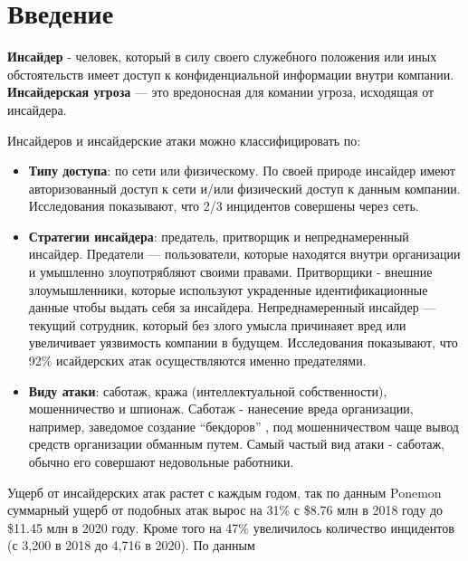 \section*{Введение}
\textbf{Инсайдер} - человек, который в силу своего служебного положения или иных обстоятельств имеет доступ к конфиденциальной информации внутри компании.
\textbf{Инсайдерская угроза} --- это вредоносная для комании угроза, исходящая от инсайдера. 

Инсайдеров и инсайдерские атаки можно классифицировать по: 
\begin{itemize}
\item \textbf{Типу доступа}: по сети или физическому. По своей природе инсайдер имеют авторизованный доступ к сети и/или физический доступ к данным компании. Исследования показывают, что 2/3 инцидентов совершены через сеть.\cite{review2020}
\item \textbf{Стратегии инсайдера}: предатель, притворщик и непреднамеренный инсайдер. Предатели --- пользователи, которые находятся внутри организации и умышленно злоупотрябляют своими правами. Притворщики - внешние злоумышленники, которые используют украденные идентификационные данные чтобы выдать себя за инсайдера. Непреднамеренный инсайдер --- текущий сотрудник, который без злого умысла причинаяет вред или увеличивает уязвимость компании в будущем. Исследования показывают, что 92\% исайдерских атак осуществляются именно предателями.\cite{review2020}
\item \textbf{Виду атаки}: саботаж, кража (интеллектуальной собственности), мошенничество и шпионаж. Саботаж - нанесение вреда организации, например, заведомое создание ``бекдоров'' , под мошенничеством чаще вывод средств организации обманным путем. Самый частый вид атаки - саботаж\cite{review2020}, обычно его совершают недовольные работники.
\end{itemize}

Ущерб от инсайдерских атак растет с каждым годом, так по данным Ponemon\cite{ponemon} суммарный ущерб от подобных атак вырос на 31\% с \$8.76 млн в 2018 году до \$11.45 млн в 2020 году. Кроме того на 47\% увеличилось количество инцидентов (с 3,200 в 2018 до 4,716 в 2020).  По данным 

